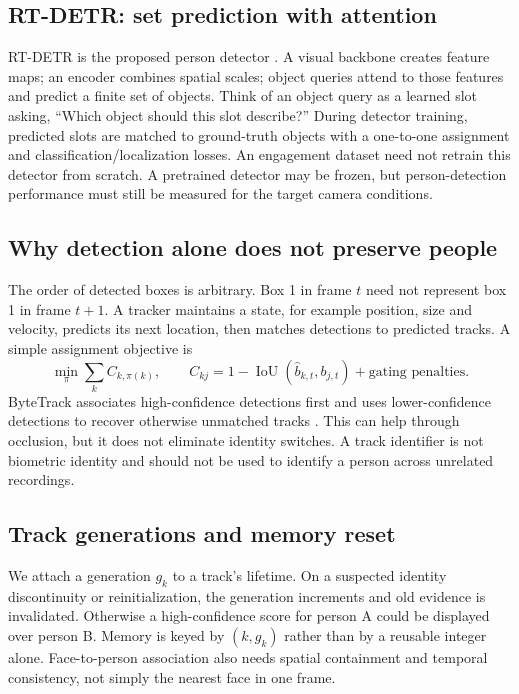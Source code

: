 \documentclass[10pt,a4paper]{article}
\begin{document}
\subsection{RT-DETR: set prediction with attention}
RT-DETR is the proposed person detector \cite{rtdetr}. A visual backbone creates feature maps; an encoder combines spatial scales; object queries attend to those features and predict a finite set of objects. Think of an object query as a learned slot asking, ``Which object should this slot describe?'' During detector training, predicted slots are matched to ground-truth objects with a one-to-one assignment and classification/localization losses. An engagement dataset need not retrain this detector from scratch. A pretrained detector may be frozen, but person-detection performance must still be measured for the target camera conditions.

\subsection{Why detection alone does not preserve people}
The order of detected boxes is arbitrary. Box 1 in frame $t$ need not represent box 1 in frame $t+1$. A tracker maintains a state, for example position, size and velocity, predicts its next location, then matches detections to predicted tracks. A simple assignment objective is
\begin{equation}
\min_{\pi}\sum_k C_{k,\pi(k)},\qquad
C_{kj}=1-\operatorname{IoU}(\hat b_{k,t},b_{j,t})+\text{gating penalties}.
\end{equation}
ByteTrack associates high-confidence detections first and uses lower-confidence detections to recover otherwise unmatched tracks \cite{bytetrack}. This can help through occlusion, but it does not eliminate identity switches. A track identifier is not biometric identity and should not be used to identify a person across unrelated recordings.

\subsection{Track generations and memory reset}
We attach a generation $g_k$ to a track's lifetime. On a suspected identity discontinuity or reinitialization, the generation increments and old evidence is invalidated. Otherwise a high-confidence score for person A could be displayed over person B. Memory is keyed by $(k,g_k)$ rather than by a reusable integer alone. Face-to-person association also needs spatial containment and temporal consistency, not simply the nearest face in one frame.
\end{document}
